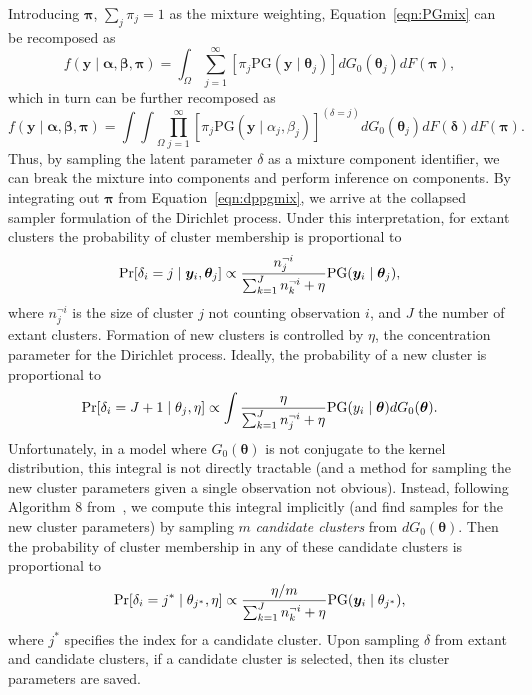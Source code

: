 Introducing $\bm{\pi}$, $\sum_j\pi_j = 1$ as the mixture weighting, Equation~\ref{eqn:PGmix} can be recomposed as
\begin{equation*}
    f(\bm{y}\mid\bm{\alpha},\bm{\beta},\bm{\pi}) = \int_{\Omega}\sum_{j = 1}^{\infty}\left[\pi_j\text{PG}(\bm{y}\mid\bm{\theta}_j)\right]dG_0(\bm{\theta}_j)dF(\bm{\pi}),
\end{equation*}
which in turn can be further recomposed as
\begin{equation}
    \label{eqn:dppgmix}
    f(\bm{y}\mid\bm{\alpha},\bm{\beta},\bm{\pi}) = {\int\int}_{\Omega} \prod_{j = 1}^{\infty}\left[\pi_j\text{PG}\left(\bm{y}\mid\alpha_j,\beta_j\right)\right]^{(\delta = j)}dG_0(\bm{\theta}_j)dF(\bm{\delta})dF(\bm{\pi}).
\end{equation}
Thus, by sampling the latent parameter $\delta$ as a mixture component identifier, we can break the mixture into components and perform inference on components.  By integrating out $\bm{\pi}$ from Equation~\ref{eqn:dppgmix}, we arrive at the collapsed sampler formulation of the Dirichlet process\needcite.  Under this interpretation, for extant clusters the probability of cluster membership is proportional to
\begin{equation*}
    \prob{\delta_i = j\mid \bm{y}_i, \bm{\theta}_j} \propto \frac{n_j^{\neg i}}{\sum_{k = 1}^{J}n_k^{\neg i} + \eta}\text{PG}\left(\bm{y}_i\mid\bm{\theta}_j\right),
\end{equation*}
where $n_j^{\neg i}$ is the size of cluster $j$ not counting observation $i$, and $J$ the number of extant clusters.  Formation of new clusters is controlled by $\eta$, the concentration parameter for the Dirichlet process. Ideally, the probability of a new cluster is proportional to
\begin{equation*}
    \prob{\delta_i = J + 1\mid\theta_j,\eta} \propto \int\frac{\eta}{\sum_{k = 1}^{J}n_j^{\neg i} + \eta}\text{PG}\left(y_i\mid\bm{\theta}\right)dG_0(\bm{\theta}).
\end{equation*}
Unfortunately, in a model where $G_0(\bm{\theta})$ is not conjugate to the kernel distribution, this integral is not directly tractable (and a method for sampling the new cluster parameters given a single observation not obvious).  Instead, following Algorithm 8 from~\cite{neal2000}, we compute this integral implicitly (and find samples for the new cluster parameters) by sampling $m$ \emph{candidate clusters} from $dG_0(\bm{\theta})$.  Then the probability of cluster membership in any of these candidate clusters is proportional to
\begin{equation*}
    \prob{\delta_i = j^{*}\mid\theta_{j^*}, \eta} \propto \frac{\eta / m}{\sum_{k = 1}^{J}n_k^{\neg i} + \eta}\text{PG}\left(\bm{y}_i\mid\theta_{j^*}\right),
\end{equation*}
where $j^*$ specifies the index for a candidate cluster.  Upon sampling $\delta$ from extant and candidate clusters, if a candidate cluster is selected, then its cluster parameters are saved.

